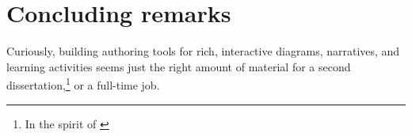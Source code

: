 
\section{Concluding remarks}

Curiously, building authoring tools for rich, interactive diagrams, narratives, and learning activities seems just the right amount of material for a second dissertation,\footnote{In the spirit of \citet{barik_error_nodate}} or a full-time job.